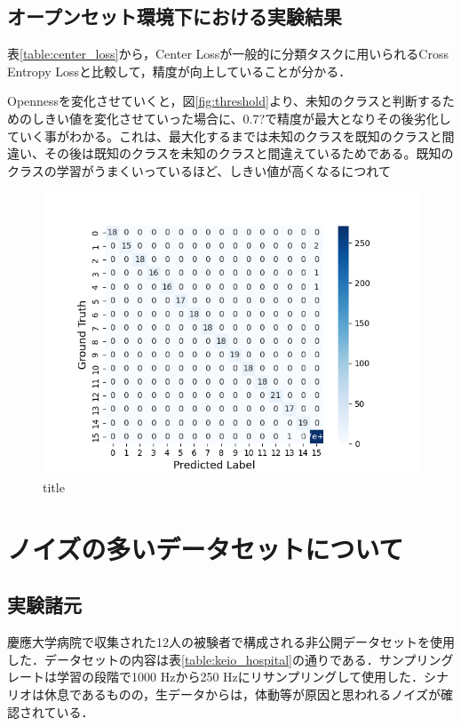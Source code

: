 \subsection{オープンセット環境下における実験結果}
表\ref{table:center_loss}から，Center Lossが一般的に分類タスクに用いられるCross Entropy Lossと比較して，精度が向上していることが分かる．

Opennessを変化させていくと，図\ref{fig:threshold}より、未知のクラスと判断するためのしきい値を変化させていった場合に、0.7?で精度が最大となりその後劣化していく事がわかる。これは、最大化するまでは未知のクラスを既知のクラスと間違い、その後は既知のクラスを未知のクラスと間違えているためである。既知のクラスの学習がうまくいっているほど、しきい値が高くなるにつれて

\begin{figure}[H]
\begin{center}
\includegraphics[width=\linewidth]{./fig/clean_dataset/cross_val_Fold0_threshold0.8_15_15.png}
\end{center}
\caption{title}
\end{figure}


\section{ノイズの多いデータセットについて}
\subsection{実験諸元}
慶應大学病院で収集された12人の被験者で構成される非公開データセットを使用した．データセットの内容は表\ref{table:keio_hospital}の通りである．サンプリングレートは学習の段階で1000 Hzから250 Hzにリサンプリングして使用した．シナリオは休息であるものの，生データからは，体動等が原因と思われるノイズが確認されている．

